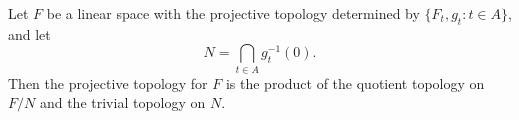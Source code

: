 Let $F$ be a linear space with the projective topology determined by $\{F_t, g_t : t \in A\}$, and let
$$N = \bigcap_{t \in A} g_t^{-1}(0).$$
Then the projective topology for $F$ is the product of the quotient topology on $F/N$ and the trivial topology on $N$.
